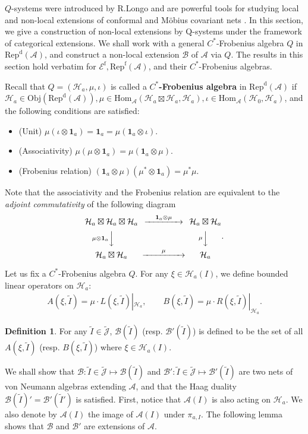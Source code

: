 \documentclass[12pt,a4paper]{article}
\theoremstyle{definition}
\newtheorem{df}{Definition}[section]
\theoremstyle{plain}
\newcommand{\mc}{\mathcal}
\newcommand{\wtd}{\widetilde}
\newcommand{\id}{\mathbf{1}}
\newcommand{\Hom}{\mathrm{Hom}}
\newcommand{\Jtd}{\widetilde{\mathcal J}}
\newcommand{\RepdA}{\mathrm{Rep}^{\mathrm d}(\mc A)}
\newcommand{\RepfA}{\mathrm{Rep}^{\mathrm f}(\mc A)}
\newcommand{\Obj}{\mathrm{Obj}}
\newcommand{\Ef}{\mathscr E^{\mathrm f}}
\numberwithin{equation}{section}
\begin{document}
$Q$-systems were introduced by R.Longo \cite{Lon94} and are powerful tools for studying local and non-local extensions of conformal and M\"obius covariant nets \cite{LR95,KL04,BKLR15}. In this section, we give a construction of non-local extensions by Q-systems under the framework of categorical extensions. We shall work with a general $C^*$-Frobenius algebra $Q$ in $\RepdA$, and construct a non-local extension $\mc B$ of $\mc A$ via $Q$. The results in this section hold verbatim for $\Ef,\RepfA$, and their $C^*$-Frobenius algebras.

Recall that $Q=(\mc H_a,\mu,\iota)$ is called a \textbf{$C^*$-Frobenius algebra} in $\RepdA$ if $\mc H_a\in\Obj(\RepdA),\mu\in\Hom_{\mc A}(\mc H_a\boxtimes \mc H_a,\mc H_a),\iota\in\Hom_{\mc A}(\mc H_0,\mc H_a)$, and the following conditions are satisfied:
\begin{itemize}
\item (Unit) $\mu(\iota\otimes\id_a)=\id_a=\mu(\id_a\otimes\iota)$.
\item (Associativity) $\mu(\mu\otimes\id_a)=\mu(\id_a\otimes\mu)$.
\item (Frobenius relation) $(\id_a\otimes\mu)(\mu^*\otimes\id_a)=\mu^*\mu$.
\end{itemize}
Note that the associativity and the Frobenius relation are equivalent to the \emph{adjoint commutativity} of the following diagram
	\begin{align}
\begin{CD}
\mc H_a\boxtimes \mc H_a\boxtimes \mc H_a @> \quad \id_a\otimes\mu \quad   >> \mc H_a\boxtimes \mc H_a\\
@V \mu\otimes\id_a   V  V @V \mu VV\\
\mc H_a\boxtimes \mc H_a @> \qquad \mu \qquad  >> \mc H_a
\end{CD}.\label{eq6}
\end{align}


Let us fix a $C^*$-Frobenius algebra $Q$. For any $\xi\in\mc H_a(I)$, we define bounded linear operators on $\mc H_a$:
\begin{align*}
A(\xi,\wtd I)=\mu\cdot L(\xi,\wtd I)|_{\mc H_a},\qquad B(\xi,\wtd I)=\mu\cdot R(\xi,\wtd I)|_{\mc H_a}.
\end{align*}



\begin{df}
For any $\wtd I\in\Jtd$,  $\mc B(\wtd I)$ (resp. $\mc B'(\wtd I)$) is defined to be the set of all $A(\xi,\wtd I)$ (resp. $B(\xi,\wtd I)$) where $\xi\in\mc H_a(I)$.
\end{df}
We shall show that $\mc B:\wtd I\in\Jtd\mapsto \mc B(\wtd I)$ and $\mc B':\wtd I\in\Jtd\mapsto \mc B'(\wtd I)$ are two nets of von Neumann algebras extending $\mc A$, and that the Haag duality $\mc B(\wtd I)'=\mc B'(\wtd I')$ is satisfied. First, notice that $\mc A(I)$ is also acting on $\mc H_a$. We also denote by $\mc A(I)$ the image of $\mc A(I)$ under $\pi_{a,I}$. The following lemma shows that $\mc B$ and $\mc B'$ are  extensions of $\mc A$.
\end{document}
